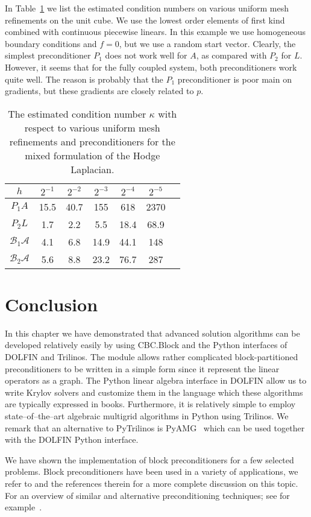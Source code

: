 In Table~\ref{table:hodge} we list the estimated condition numbers on
various uniform mesh refinements on the unit cube. We use the lowest
order \nedelec{} elements of first kind~\citep{Nedelec1980} combined
with continuous piecewise linears. In this example we use homogeneous
boundary conditions and $f=0$, but we use a random start vector.
Clearly, the simplest preconditioner $P_1$ does not work well for
$A$, as compared with $P_2$ for $L$. However, it seems that
for the fully coupled system, both preconditioners work quite
well. The reason is probably that the $P_1$ preconditioner
is poor main on gradients, but these gradients are closely related to
$p$.
\begin{table}
  \centering
  \begin{tabular}{ccccccc}
    \toprule
    $h$ & $2^{-1}$ & $2^{-2}$ & $2^{-3}$ & $2^{-4}$  & $2^{-5}$ \\
    \midrule
    $ P_1 A $ & 15.5 & 40.7 & 155 & 618 & 2370 \\
    $ P_2 L $ & 1.7 & 2.2  & 5.5  & 18.4 & 68.9 \\
    $\mathcal{B}_1 \mathcal{A}$ & 4.1 & 6.8 & 14.9 & 44.1 & 148 \\
    $\mathcal{B}_2 \mathcal{A}$ & 5.6 & 8.8 & 23.2 & 76.7  & 287 \\
    \bottomrule
  \end{tabular}
  \caption{The estimated condition number $\kappa$ with respect to
    various uniform mesh refinements and preconditioners for the mixed
    formulation of the Hodge Laplacian.}  \label{table:hodge}
\end{table}

\section{Conclusion}

In this chapter we have demonstrated that advanced solution algorithms
can be developed relatively easily by using CBC.Block and the Python
interfaces of DOLFIN and Trilinos. The  module allows
rather complicated block-partitioned preconditioners to be written in
a simple form since it represent the linear operators as a graph. The
Python linear algebra interface in DOLFIN allow us to write Krylov
solvers and customize them in the language which these algorithms are
typically expressed in books.  Furthermore, it is relatively simple to
employ state--of--the--art algebraic multigrid algorithms in Python
using Trilinos.  We remark that an alternative to PyTrilinos is
PyAMG~\citep{BellOlsonSchroder2009} which can be used together with
the DOLFIN Python interface.

We have shown the implementation of block preconditioners for a few
selected problems.  Block preconditioners have been used in a variety
of applications, we refer to \citet{MardalWinther11} and the
references therein for a more complete discussion on this topic.  For
an overview of similar and alternative preconditioning techniques; see
for
example~\citet{BenziGolubLiesen2005,ElmanSilvesterWathen2005,Hiptmair2006,Kirby2010}.
